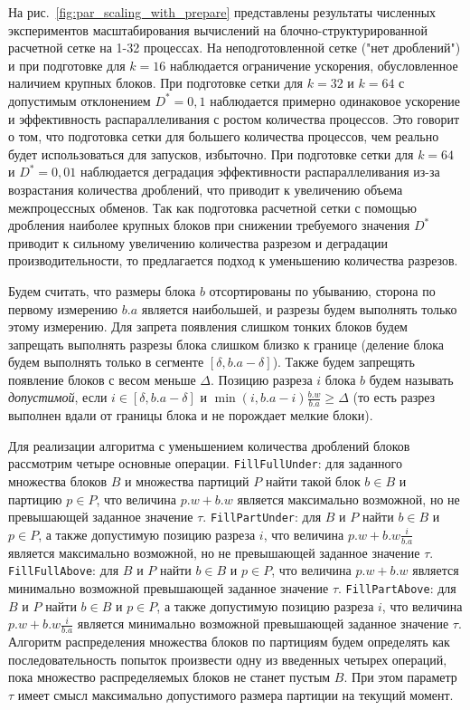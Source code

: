 \documentclass[a4paper,14pt]{extarticle}                     %
\theoremstyle{plain}                                         %
\begin{document}
На рис.~\ref{fig:par_scaling_with_prepare} представлены результаты численных экспериментов масштабирования вычислений на блочно-структурированной расчетной сетке на 1-32 процессах.
На неподготовленной сетке ("нет дроблений") и при подготовке для $k = 16$ наблюдается ограничение ускорения, обусловленное наличием крупных блоков. 
При подготовке сетки для $k = 32$ и $k = 64$ с допустимым отклонением $D^{*} = 0{,}1$ наблюдается примерно одинаковое ускорение и эффективность распараллеливания с ростом количества процессов.
Это говорит о том, что подготовка сетки для большего количества процессов, чем реально будет использоваться для запусков, избыточно.
При подготовке сетки для $k = 64$ и $D^{*} = 0{,}01$ наблюдается деградация эффективности распараллеливания из-за возрастания количества дроблений, что приводит к увеличению объема межпроцессных обменов.
Так как подготовка расчетной сетки с помощью дробления наиболее крупных блоков при снижении требуемого значения $D^{*}$ приводит к сильному увеличению количества разрезом и деградации производительности, то предлагается подход к уменьшению количества разрезов.

Будем считать, что размеры блока $b$ отсортированы по убыванию, сторона по первому измерению $b.a$ является наибольшей, и разрезы будем выполнять только этому измерению.
Для запрета появления слишком тонких блоков будем запрещать выполнять разрезы блока слишком близко к границе (деление блока будем выполнять только в сегменте $[\delta, b.a - \delta]$).
Также будем запрещять появление блоков с весом меньше $\Delta$.
Позицию разреза $i$ блока $b$ будем называть \textit{допустимой}, если $i \in [\delta, b.a - \delta]$ и $\min(i, b.a - i)\frac{b.w}{b.a} \ge \Delta$ (то есть разрез выполнен вдали от границы блока и не порождает мелкие блоки).

Для реализации алгоритма с уменьшением количества дроблений блоков рассмотрим четыре основные операции.
\texttt{FillFullUnder}: для заданного множества блоков $B$ и множества партиций $P$ найти такой блок $b \in B$ и партицию $p \in P$, что величина $p.w + b.w$ является максимально возможной, но не превышающей заданное значение $\tau$.
\texttt{FillPartUnder}: для $B$ и $P$ найти $b \in B$ и $p \in P$, а также допустимую позицию разреза $i$, что величина $p.w + b.w \frac{i}{b.a}$ является максимально возможной, но не превышающей заданное значение $\tau$.
\texttt{FillFullAbove}: для $B$ и $P$ найти $b \in B$ и $p \in P$, что величина $p.w + b.w$ является минимально возможной превышающей заданное значение $\tau$.
\texttt{FillPartAbove}: для $B$ и $P$ найти $b \in B$ и $p \in P$, а также допустимую позицию разреза $i$, что величина $p.w + b.w \frac{i}{b.a}$ является минимально возможной превышающей заданное значение $\tau$.
Алгоритм распределения множества блоков по партициям будем определять как последовательность попыток произвести одну из введенных четырех операций, пока множество распределяемых блоков не станет пустым $B$.
При этом параметр $\tau$ имеет смысл максимально допустимого размера партиции на текущий момент.
\end{document}
